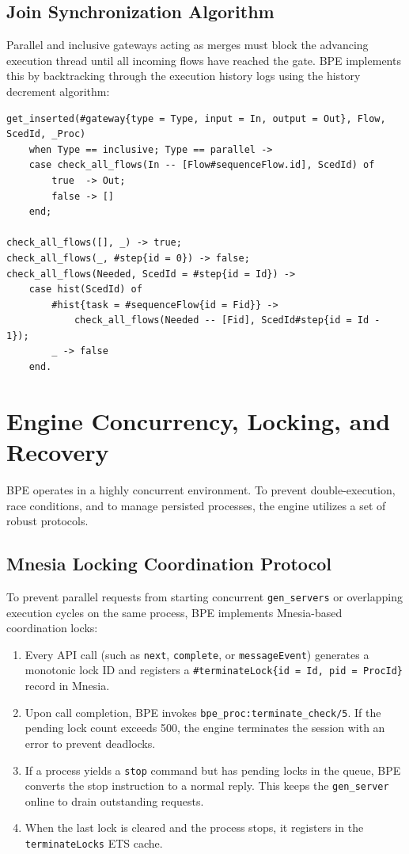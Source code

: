 \documentclass[11pt,a4paper]{article}
\begin{document}
\newpage
\subsection{Join Synchronization Algorithm}

Parallel and inclusive gateways acting as merges must block the advancing execution thread until all incoming flows have reached the gate. BPE implements this by backtracking through the execution history logs using the history decrement algorithm:

\begin{lstlisting}
get_inserted(#gateway{type = Type, input = In, output = Out}, Flow, ScedId, _Proc)
    when Type == inclusive; Type == parallel ->
    case check_all_flows(In -- [Flow#sequenceFlow.id], ScedId) of
        true  -> Out;
        false -> []
    end;

check_all_flows([], _) -> true;
check_all_flows(_, #step{id = 0}) -> false;
check_all_flows(Needed, ScedId = #step{id = Id}) ->
    case hist(ScedId) of
        #hist{task = #sequenceFlow{id = Fid}} ->
            check_all_flows(Needed -- [Fid], ScedId#step{id = Id - 1});
        _ -> false
    end.
\end{lstlisting}

\newpage
\section{Engine Concurrency, Locking, and Recovery}

BPE operates in a highly concurrent environment. To prevent double-execution, race conditions, and to manage persisted processes, the engine utilizes a set of robust protocols.

\subsection{Mnesia Locking Coordination Protocol}

To prevent parallel requests from starting concurrent \texttt{gen\_servers} or overlapping execution cycles on the same process, BPE implements Mnesia-based coordination locks:
\begin{enumerate}
    \item Every API call (such as \texttt{next}, \texttt{complete}, or \texttt{messageEvent}) generates a monotonic lock ID and registers a \texttt{\#terminateLock\{id = Id, pid = ProcId\}} record in Mnesia.
    \item Upon call completion, BPE invokes \texttt{bpe\_proc:terminate\_check/5}. If the pending lock count exceeds 500, the engine terminates the session with an error to prevent deadlocks.
    \item If a process yields a \texttt{stop} command but has pending locks in the queue, BPE converts the stop instruction to a normal reply. This keeps the \texttt{gen\_server} online to drain outstanding requests.
    \item When the last lock is cleared and the process stops, it registers in the \texttt{terminateLocks} ETS cache.
\end{enumerate}
\end{document}
